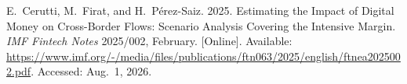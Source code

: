 \documentclass[12pt,a4paper]{report}
\begin{document}
{\begin{enumerate}[label={[\arabic*]}]





\item E.~Cerutti, M.~Firat, and H.~P\'{e}rez-Saiz. 2025. Estimating the Impact of Digital Money on Cross-Border Flows: Scenario Analysis Covering the Intensive Margin. \emph{IMF Fintech Notes} 2025/002, February. [Online]. Available: \url{https://www.imf.org/-/media/files/publications/ftn063/2025/english/ftnea2025002.pdf}. Accessed: Aug.~1, 2026.



\end{enumerate}}
\end{document}
